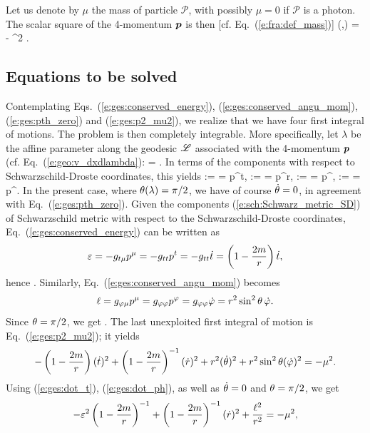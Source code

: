 Let us denote by $\mu$ the mass of particle $\mathscr{P}$, with possibly
$\mu=0$ if $\mathscr{P}$ is a photon. The scalar square of the 4-momentum $\bm{p}$ is
then [cf. Eq.~(\ref{e:fra:def_mass})]
\be \label{e:ges:p2_mu2}
    (,) = - \mu^2 .
\ee

\subsection{Equations to be solved}

Contemplating Eqs.~(\ref{e:ges:conserved_energy}), (\ref{e:ges:conserved_angu_mom}),
(\ref{e:ges:pth_zero}) and (\ref{e:ges:p2_mu2}), we realize that we have
four first integral of motions. The problem is then completely integrable.
More specifically, let $\lambda$ be the affine parameter along the geodesic
$\mathscr{L}$ associated with the 4-momentum $\bm{p}$ (cf. Eq.~(\ref{e:geo:v_dxdlambda}):
\be
     =  .
\ee
In terms of the components with respect to Schwarzschild-Droste coordinates,
this yields
\be
     :=  = p^t,\qquad
     :=  = p^r,\qquad
    \dot{\th} := \frac{\D \th}{\D\lambda} = p^\th,\qquad
    \dot{\ph} := \frac{\D \ph}{\D\lambda} = p^\ph .
\ee
In the present case, where $\theta(\lambda)=\pi/2$, we have of course $\dot{\theta}=0$,
in agreement with Eq.~(\ref{e:ges:pth_zero}).
Given the components (\ref{e:sch:Schwarz_metric_SD}) of Schwarzschild metric
with respect to the Schwarzschild-Droste coordinates,
Eq.~(\ref{e:ges:conserved_energy}) can be written as
\[
    \varepsilon = - g_{t\mu} p^\mu = - g_{tt} p^t = - g_{tt} \dot{t}
    = \left(1 - \frac{2m}{r} \right) \dot{t} ,
\]
hence
\be \label{e:ges:dot_t}
    .
\ee
Similarly, Eq.~(\ref{e:ges:conserved_angu_mom}) becomes
\[
    \ell = g_{\varphi\mu} p^\mu = g_{\varphi\varphi} p^\varphi  = g_{\varphi\varphi} \dot{\varphi}
        = r^2 \sin^2\theta \, \dot{\varphi} .
\]
Since $\theta=\pi/2$, we get
\be \label{e:ges:dot_ph}
     .
\ee
The last unexploited first integral of motion is Eq.~(\ref{e:ges:p2_mu2}); it
yields
\[
   - \left( 1 - \frac{2m}{r} \right) (\dot{t})^2 +
   \left( 1 - \frac{2m}{r} \right) ^{-1}  (\dot{r})^2
   + r^2 (\dot{\theta})^2 + r^2 \sin^2\theta (\dot{\varphi})^2  = - \mu^2 .
\]
Using (\ref{e:ges:dot_t}), (\ref{e:ges:dot_ph}), as well as
$\dot{\theta}=0$ and $\theta=\pi/2$, we get
\[
    -  \varepsilon^2 \left(1 - \frac{2m}{r} \right) ^{-1}
    +  \left( 1 - \frac{2m}{r} \right) ^{-1}  (\dot{r})^2
    +  \frac{\ell^2}{r^2} = - \mu^2 ,
\]
